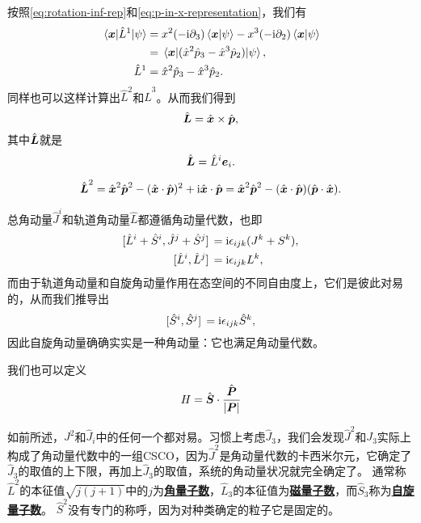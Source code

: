 \documentclass[hyperref, UTF8, a4paper]{ctexart}
\newcommand*{\ii}{\mathrm{i}}
\newcommand{\concept}[1]{\underline{\textbf{#1}}}
\begin{document}
按照\eqref{eq:rotation-inf-rep}和\eqref{eq:p-in-x-representation}，我们有
\[
    \begin{aligned}
        \mel{\vb*{x}}{\hat{L}^1}{\psi} &= x^2 (- \ii \partial_3) \braket{\vb*{x}}{\psi} - x^3 (- \ii \partial_2) \braket{\vb*{x}}{\psi} \\
        &= \mel{\vb*{x}}{(\hat{x}^2 \hat{p}_3 - \hat{x}^3 \hat{p}_2)}{\psi}, \\
        \hat{L}^1 &= \hat{x}^2 \hat{p}_3 - \hat{x}^3 \hat{p}_2.
    \end{aligned}
\]
同样也可以这样计算出$\hat{L}^2$和$\hat{L}^3$。从而我们得到
\begin{equation}
    \hat{\vb*{L}} = \hat{\vb*{x}} \times \hat{\vb*{p}},
\end{equation}
其中$\hat{\vb*{L}}$就是
\begin{equation}
    \hat{\vb*{L}} = \hat{L}^i \vb*{e}_i.
\end{equation}

\begin{equation}
    \hat{\vb*{L}}^2 = \hat{\vb*{x}}^2 \hat{\vb*{p}}^2 - (\hat{\vb*{x}} \cdot \hat{\vb*{p}})^2 + \ii \hat{\vb*{x}} \cdot \hat{\vb*{p}} = \hat{\vb*{x}}^2 \hat{\vb*{p}}^2 - (\hat{\vb*{x}} \cdot \hat{\vb*{p}}) (\hat{\vb*{p}} \cdot \hat{\vb*{x}}).
\end{equation}

总角动量$\hat{J}^i$和轨道角动量$\hat{L}$都遵循角动量代数，也即
\[
    \begin{aligned}
        \comm*{\hat{L}^i+\hat{S}^i}{\hat{J}^j+\hat{S}^j} &= \ii \epsilon_{ijk} (J^k+S^k), \\
        \comm*{\hat{L}^i}{\hat{L}^j} &= \ii \epsilon_{ijk} L^k,
    \end{aligned}
\]
而由于轨道角动量和自旋角动量作用在态空间的不同自由度上，它们是彼此对易的，从而我们推导出
\[
    \comm*{\hat{S}^i}{\hat{S}^j} = \ii \epsilon_{ijk} \hat{S}^k,
\]
因此自旋角动量确确实实是一种角动量：它也满足角动量代数。

我们也可以定义
\begin{equation}
    H = \hat{\vb*{S}} \cdot \frac{\hat{\vb*{P}}}{\abs{\vb*{P}}}
\end{equation}

如前所述，$J^2$和$\hat{J}_i$中的任何一个都对易。习惯上考虑$\hat{J}_3$，我们会发现$\hat{J}^2$和$J_3$实际上构成了角动量代数中的一组CSCO，因为$\hat{J}^2$是角动量代数的卡西米尔元，它确定了$\hat{J}_3$的取值的上下限，再加上$\hat{J}_3$的取值，系统的角动量状况就完全确定了。
通常称$\hat{L}^2$的本征值$\sqrt{j(j+1)}$中的$j$为\concept{角量子数}，$\hat{L}_3$的本征值为\concept{磁量子数}，而$\hat{S}_3$称为\concept{自旋量子数}。
$\hat{S}^2$没有专门的称呼，因为对种类确定的粒子它是固定的。
\end{document}
